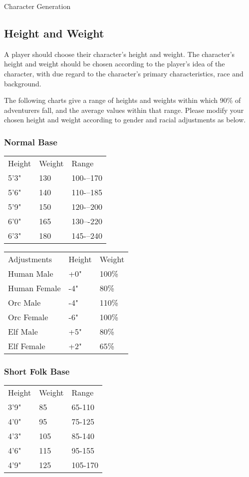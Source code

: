 \begin{Chapter}{Character Generation}
\subsection{Height and Weight}

A player should choose their character’s height and weight.  The
character’s height and weight should be chosen according to the
player’s idea of the character, with due regard to the character’s
primary characteristics, race and background.

The following charts give a range of heights and weights within which
90\% of adventurers fall, and the average values within that range.
Please modify your chosen height and weight according to gender and
racial adjustments as below.

\subsubsection{Normal Base}

\begin{tabularx}{\columnwidth}{lll}
Height		& Weight	& Range \\
5’3"		& 130		& 100-–170 \\
5’6"		& 140		& 110-–185 \\
5’9"		& 150		& 120-–200 \\
6’0"		& 165		& 130–-220 \\
6’3"		& 180		& 145-–240 \\
\end{tabularx}

\begin{tabularx}{\columnwidth}{lll}
Adjustments	& Height	& Weight \\
Human Male	& +0"		& 100\% \\
Human Female	& -4"		& 80\% \\
Orc Male	& -4"		& 110\% \\
Orc Female	& -6"		& 100\% \\
Elf Male	& +5"		& 80\% \\
Elf Female	& +2"		& 65\% \\
\end{tabularx}

\subsubsection{Short Folk Base}


\begin{tabularx}{\columnwidth}{lll}
Height		& Weight	& Range \\
3’9"		& 85		& 65-110 \\
4’0"		& 95		& 75-125 \\
4’3"		& 105		& 85-140 \\
4’6"		& 115		& 95-155 \\
4’9"		& 125		& 105-170 \\
\end{tabularx}



\end{Chapter}

